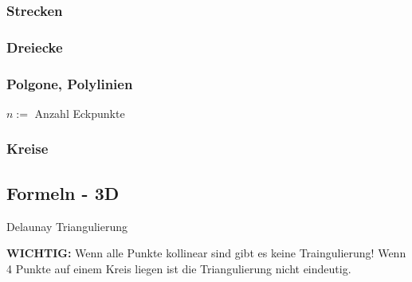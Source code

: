 \subsubsection{Strecken}
\subsubsection{Dreiecke}

\subsubsection{Polgone, Polylinien}
$n := $ Anzahl Eckpunkte
\subsubsection{Kreise}

\subsection{Formeln - 3D}



\begin{algorithm}[optional]{Delaunay Triangulierung}
	\begin{methods}
	\end{methods}
	\textbf{WICHTIG:} Wenn alle Punkte kollinear sind gibt es keine Traingulierung! Wenn 4 Punkte auf einem Kreis liegen ist die Triangulierung nicht eindeutig.
\end{algorithm}

